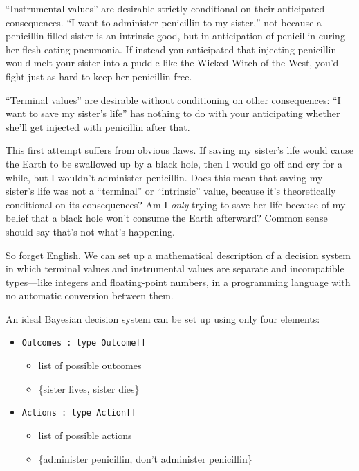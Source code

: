 {{
 ``Instrumental values'' are
desirable strictly conditional on their anticipated consequences.
``I want to administer penicillin to my
sister,'' not because a penicillin-filled sister is
an intrinsic good, but in anticipation of penicillin curing her
flesh-eating pneumonia. If instead you anticipated that injecting
penicillin would melt your sister into a puddle like the Wicked Witch
of the West, you'd fight just as hard to keep her
penicillin-free.}

{
 ``Terminal values'' are
desirable without conditioning on other consequences:
``I want to save my sister's
life'' has nothing to do with your anticipating
whether she'll get injected with penicillin after
that.}

{
 This first attempt suffers from obvious flaws. If saving my
sister's life would cause the Earth to be swallowed up
by a black hole, then I would go off and cry for a while, but I
wouldn't administer penicillin. Does this mean that
saving my sister's life was not a
``terminal'' or
``intrinsic'' value, because
it's theoretically conditional on its consequences? Am
I \textit{only} trying to save her life because of my belief that a
black hole won't consume the Earth afterward? Common
sense should say that's not what's
happening.}

{
 So forget English. We can set up a mathematical description of a
decision system in which terminal values and instrumental values are
separate and incompatible types---like integers and floating-point
numbers, in a programming language with no automatic conversion between
them.}

{
 An ideal Bayesian decision system can be set up using only four
elements:}

\begin{itemize}
\item  \texttt{Outcomes : type Outcome[]}
  \begin{itemize}
    \item list of possible outcomes
    \item \{sister lives, sister dies\}
  \end{itemize}

\item \texttt{Actions : type Action[]}
  \begin{itemize}
    \item list of possible actions
    \item \{administer penicillin, don't administer penicillin\}
  \end{itemize}


\end{itemize}}
